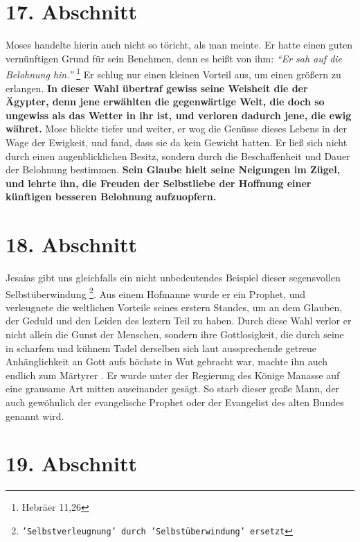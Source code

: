 \section{17. Abschnitt} \label{kap4_ab17}

Moses handelte hierin auch nicht so töricht, als man meinte. Er hatte einen
guten vernünftigen Grund für sein Benehmen, denn es heißt von ihm:
\textit{"`Er sah auf die Belohnung hin."'}
\footnote{Hebräer 11,26}
Er schlug nur einen kleinen
Vorteil aus, um einen größern zu erlangen. \textbf{In dieser Wahl übertraf
gewiss seine
Weisheit die der Ägypter, denn jene erwählten die gegenwärtige Welt, die doch so
ungewiss als das Wetter in ihr ist, und verloren dadurch jene, die ewig währet.}
Mose blickte tiefer und weiter, er wog die Genüsse dieses Lebens in der Wage der
Ewigkeit,  und fand, dass sie da kein Gewicht hatten. Er
ließ sich nicht durch
einen augenblicklichen Besitz, sondern durch die Beschaffenheit und Dauer der
Belohnung bestimmen. \textbf{Sein Glaube hielt seine Neigungen im Zügel, und
lehrte ihn,
die Freuden der Selbstliebe der Hoffnung einer künftigen besseren Belohnung
aufzuopfern.}

\section{18. Abschnitt} \label{kap4_ab18}

 Jesaias gibt uns gleichfalls ein nicht unbedeutendes
Beispiel dieser
segensvollen Selbstüberwindung \footnote{\texttt{'Selbstverleugnung' durch
'Selbstüberwindung' ersetzt}}. Aus einem Hofmanne wurde er ein Prophet, und
verleugnete die weltlichen Vorteile seines erstern Standes, um an dem Glauben,
der Geduld und den Leiden des leztern Teil zu haben. Durch diese Wahl verlor er
nicht allein die Gunst der Menschen, sondern ihre Gottlosigkeit, die durch seine
in scharfem und kühnem Tadel derselben sich laut aussprechende getreue
Anhänglichkeit an Gott aufs höchste in Wut gebracht war, machte ihn auch
endlich zum Märtyrer . Er wurde unter der Regierung des Könige
Manasse  auf eine
grausame Art mitten auseinander gesägt. So starb dieser große Mann, der auch
gewöhnlich der evangelische Prophet oder der Evangelist des alten
Bundes genannt wird.

\section{19. Abschnitt} \label{kap4_ab19}

